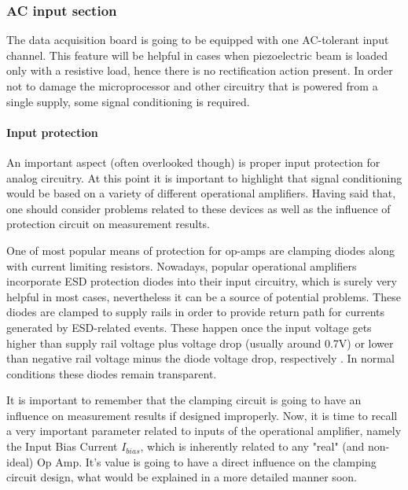 \documentclass[12pt,a4paper]{article}
\begin{document}
\subsubsection{AC input section}
The data acquisition board is going to be equipped with one AC-tolerant input channel. This feature will be helpful in cases when piezoelectric beam is loaded only with a resistive load, hence there is no rectification action present. In order not to damage the microprocessor and other circuitry that is powered from a single supply, some signal conditioning is required. 
\par
\paragraph{Input protection}
An important aspect (often overlooked though) is proper input protection for analog circuitry. At this point it is important to highlight that signal conditioning would be based on a variety of different operational amplifiers. Having said that, one should consider problems related to these devices as well as the influence of protection circuit on measurement results.
\par

One of most popular means of protection for op-amps are clamping diodes along with current limiting resistors. Nowadays, popular operational amplifiers incorporate ESD protection diodes into their input circuitry, which is surely very helpful in most cases, nevertheless it can be a source of potential problems. These diodes are clamped to supply rails in order to provide return path for currents generated by ESD-related events. These happen once the input voltage gets higher than supply rail voltage plus voltage drop (usually around 0.7V) or lower than negative rail voltage minus the diode voltage drop, respectively \cite{clamping}. In normal conditions these diodes remain transparent. 
\par

It is important to remember that the clamping circuit is going to have an influence on measurement results if designed improperly. Now, it is time to recall a very important parameter related to inputs of the operational amplifier, namely the Input Bias Current $I_{bias}$, which is inherently related to any "real" (and non-ideal) Op Amp. It's value is going to have a direct influence on the clamping circuit design, what would be explained in a more detailed manner soon.
\par
\end{document}
